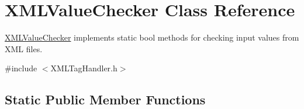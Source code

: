 \hypertarget{class_x_m_l_value_checker}{}\section{X\+M\+L\+Value\+Checker Class Reference}
\label{class_x_m_l_value_checker}


\hyperlink{class_x_m_l_value_checker}{X\+M\+L\+Value\+Checker} implements static bool methods for checking input values from X\+ML files.  




{\ttfamily \#include $<$X\+M\+L\+Tag\+Handler.\+h$>$}

\subsection*{Static Public Member Functions}
